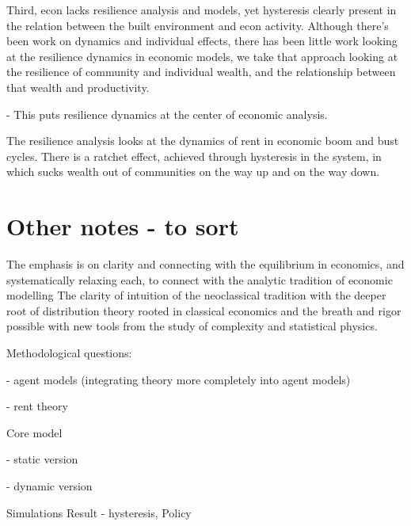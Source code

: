
Third, econ lacks resilience analysis and models, yet hysteresis clearly present in the relation between the built environment and econ activity. Although there's been work on dynamics and individual effects, there has been little work looking at the resilience dynamics in economic models, we take that approach looking at the resilience of community and individual wealth, and the relationship between that wealth and productivity. 

- This puts resilience dynamics at the center of economic analysis.

The resilience analysis looks at the dynamics of rent in economic boom and bust cycles.
There is a ratchet effect, achieved through hysteresis in the system, in which sucks wealth out of communities on the way up and on the way down. %


\section{Other notes - to sort}


The emphasis is on clarity and connecting with the equilibrium in economics, and systematically relaxing each, to connect with the analytic tradition of economic modelling
The clarity of intuition of the neoclassical tradition with the deeper root of distribution theory rooted in classical economics and the breath and rigor possible with new tools from the study of complexity and statistical physics.

Methodological questions: 

    - agent models (integrating theory more completely into agent models)
    
    - rent theory

Core model

    - static version
    
    - dynamic version

Simulations
Result - hysteresis,
Policy
